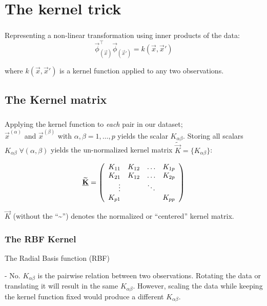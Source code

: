 \section{The kernel trick}

\begin{frame}\frametitle{\secname}

Representing a non-linear transformation using inner products of the data:
\begin{equation}
 \label{eq:trick}
      \vec{\phi}_{(\vec{x})}^\top 
		\vec{\phi}_{(\vec{x}')} = 
      k(\vec{x}, \vec{x}')
\end{equation}
    
where $k(\vec{x}, \vec{x}')$ is a kernel function applied 
to any two observations.

\end{frame}

\subsection{The Kernel matrix}

\begin{frame}\frametitle{\subsecname}

Applying the kernel function to \emph{each} pair in our dataset; \\
$\vec x^{(\alpha)}$ and $\vec{x}^{(\beta)}$ 
with $\alpha, \beta = 1, \ldots, p$ yields the scalar $K_{\alpha \beta}$. 
Storing all scalars $K_{\alpha \beta} \; \forall (\alpha,\beta)$ yields 
the un-normalized kernel matrix $\widetilde {\vec K}=\{K_{\alpha \beta}\}$:

\begin{equation}
\widetilde {\underline{\mathbf{K}}} = 
\left( \begin{array}{rrrrrrrrrrrrrrrrrrrrrrrrrr} 
K_{11} & K_{12} & \ldots & K_{1p} \\
K_{21} & K_{12} & \ldots & K_{2p} \\
\vdots & & \ddots\\
K_{p1} & & & K_{pp}
\\ \end{array} \right)
\end{equation}

$\vec K$ (without the ``\textasciitilde'') denotes the normalized or ``centered'' kernel matrix. 


\end{frame}

\begin{frame}\frametitle{The RBF Kernel}

The Radial Basis function (RBF) 


- No. $K_{\alpha \beta}$ is the pairwise relation between two observations. 
Rotating the data or translating it will result in the same $K_{\alpha \beta}$. 
However, scaling the data while keeping the kernel function fixed would produce a different $K_{\alpha \beta}$.

\end{frame}
